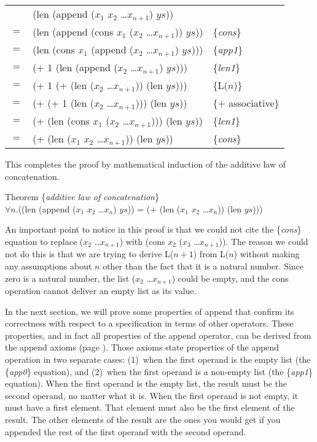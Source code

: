 \begin{center}
\begin{tabular}{lll}
    & (len (append ($x_1$ $x_2$ \dots $x_{n+1}$) $ys$))         &                     \\
$=$ & (len (append (cons $x_1$ ($x_2$ \dots $x_{n+1}$)) $ys$))  & \{\emph{cons}\}     \\
$=$ & (len (cons $x_1$ (append ($x_2$ \dots $x_{n+1}$) $ys$)))  & \{\emph{app1}\}     \\
$=$ & (+ 1 (len (append ($x_2$ \dots $x_{n+1}$) $ys$)))         & \{\emph{len1}\}     \\
$=$ & (+ 1 (+ (len ($x_2$ \dots $x_{n+1}$)) (len $ys$)))        & \{L($n$)\}          \\
$=$ & (+ (+ 1 (len ($x_2$ \dots $x_{n+1}$))) (len $ys$))        & \{$+$ associative\} \\
$=$ & (+ (len (cons $x_1$ ($x_2$ \dots $x_{n+1}$))) (len $ys$)) & \{\emph{len1}\}     \\
$=$ & (+ (len ($x_1$ $x_2$ \dots $x_{n+1}$)) (len $ys$))        & \{\emph{cons}\}     \\
\end{tabular}
\end{center}

This completes the proof by mathematical induction of the
additive law of concatenation.
\begin{center}
\label{additive-law-concatenation}
Theorem \{\emph{additive law of concatenation}\} \\
$\forall$$n$.((len (append ($x_1$ $x_2$ \dots $x_n$) $ys$))
= (+ (len ($x_1$ $x_2$ \dots $x_n$)) (len $ys$)))
\end{center}

An important point to notice in this proof is that 
we could not cite the \{\emph{cons}\} equation to replace ($x_2$ \dots $x_{n+1}$) 
with (cons $x_2$ ($x_3$ \dots $x_{n+1}$)). 
The reason we could not do this is that we are trying to derive 
L($n+1$) from L($n$) without making any assumptions about $n$ 
other than the fact that it is a natural number. 
Since zero is a natural number, the list ($x_2$ \dots $x_{n+1}$) 
could be empty, and the cons operation cannot deliver an empty list as its value.

In the next section, we will prove some properties of append 
that confirm its correctness with respect to a specification in terms of other operators. 
These properties, and in fact all properties of the append operator, 
can be derived from the append axioms (page \pageref{append-equations}). 
Those axioms state properties of the append operation in two separate cases: 
(1)~when the first operand is the empty list (the \{\emph{app0}\} equation), and 
(2)~when the first operand is a non-empty list (the \{\emph{app1}\} equation). 
When the first operand is the empty list, 
the result must be the second operand, no matter what it is. 
When the first operand is not empty, it must have a first element. 
That element must also be the first element of the result. 
The other elements of the result are the ones you would get 
if you appended the rest of the first operand with the second operand.

